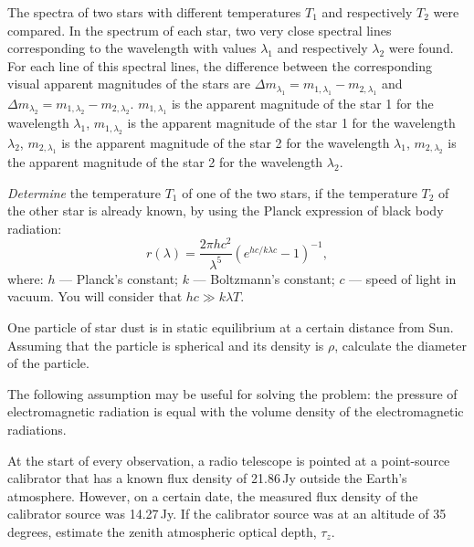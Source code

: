The spectra of two stars with different temperatures $T_1$ and respectively
$T_2$ were compared. In the spectrum of each star, two very close spectral
lines corresponding to the wavelength with values $\lambda_1$ and respectively
$\lambda_2$ were found. For each line of this spectral lines, the difference
between the corresponding visual apparent magnitudes of the stars are
$\Delta m_{\lambda_1} = m_{1,\lambda_1} - m_{2,\lambda_1}$ and
$\Delta m_{\lambda_2} = m_{1,\lambda_2} - m_{2,\lambda_2}$.
$m_{1,\lambda_1}$ is the apparent magnitude of the star 1 for the wavelength
$\lambda_1$, $m_{1,\lambda_2}$ is the apparent magnitude of the star 1 for the
wavelength $\lambda_2$, $m_{2,\lambda_1}$ is the apparent magnitude of the
star 2 for the wavelength $\lambda_1$, $m_{2,\lambda_2}$ is the apparent
magnitude of the star 2 for the wavelength $\lambda_2$.

\emph{Determine} the temperature $T_1$ of one of the two stars, if the
temperature $T_2$ of the other star is already known, by using the Planck
expression of black body radiation:
\[ r(\lambda) = \frac{2\pi h c^2}{\lambda^5}
   \left( e^{hc/k\lambda c} - 1 \right)^{-1}, \]
where: $h$ --- Planck's constant; $k$ --- Boltzmann's constant; $c$ --- speed
of light in vacuum. You will consider that $hc \gg k\lambda T$.

One particle of star dust is in static equilibrium at a certain distance from
Sun. Assuming that the particle is spherical and its density is $\rho$,
calculate the diameter of the particle.

The following assumption may be useful for solving the problem: the pressure
of electromagnetic radiation is equal with the volume density of the
electromagnetic radiations.

At the start of every observation, a radio telescope is pointed at a
point-source calibrator that has a known flux density of 21.86\,Jy outside the
Earth's atmosphere. However, on a certain date, the measured flux density of
the calibrator source was 14.27\,Jy. If the calibrator source was at an
altitude of 35 degrees, estimate the zenith atmospheric optical depth,
$\tau_z$.

